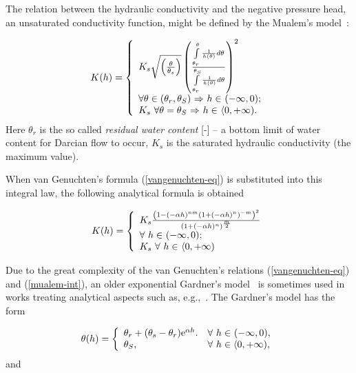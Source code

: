 \documentclass[final,3p,times,twocolumn]{elsarticle}
\begin{document}
The relation between the hydraulic conductivity and the negative pressure head, an 
unsaturated conductivity function, might be defined by the Mualem's model~\cite{mualem}:

  \begin{equation}
  \label{mualem-int}
  K(h) = \left\{
    \begin{array}{l l}
     K_s \sqrt{ \left( \frac{\theta}{\theta_s} \right)} \left( \frac{\int\limits_{\theta_r}^{\theta} \frac{1}{h(\theta)}d \theta }{\int\limits_{\theta_r}^{\theta_S} \frac{1}{h(\theta)} d \theta} \right)^2  \\
    \mbox{$\forall \theta \in (\theta_r, \theta_S )$ $\Rightarrow$ $h \in$ $(-\infty,0)$}; \\
    K_s \ \mbox{$\forall \theta= \theta_S $  $\Rightarrow$  $h \in$ $\langle 0, +\infty)$}.\\
    \end{array} \right.
    \end{equation}
Here $\theta_r$ is the so called {\em residual water content} [-] -- a bottom 
limit of water content for Darcian flow to occur, $K_s$ is the saturated 
hydraulic conductivity (the maximum value).


When van Genuchten's formula (\ref{vangenuchten-eq}) is substituted into this integral 
law, the following analytical formula is obtained

  \begin{equation}
  \label{mualem-anal}
  K(h) = \left\{
    \begin{array}{l l}
    K_s \frac{\left( 1- (-\alpha h)^{nm} \left( 1+ (-\alpha h)^n \right)^{-m} \right)^2}{\left(1+(-\alpha h)^n \right)^{\frac{m}{2}}} \\
    \mbox{$\forall$ $h \in$ $(-\infty,0)$};\\
    K_s  \ \mbox{$\forall$ $h \in$ $\langle 0, +\infty)$}\\
    \end{array} \right.
    \end{equation}

Due to the great complexity of the van Genuchten's relations (\ref{vangenuchten-eq}) 
and (\ref{mualem-int}), an older exponential Gardner's model~\cite{gardner} 
is sometimes used in works treating analytical aspects such as, e.g.,~\cite{tracy1,tracy2}. 
The Gardner's model has the form

\begin{equation}
\label{gardner-theta}
\theta (h) = \left\{ 
\begin{array}{l l}
 \theta_r + (\theta_s -\theta_r)\textrm{e}^{\alpha h}. & \mbox{$\forall$  $h \in$ $(-\infty,0)$},\\
  \theta_S, & \mbox{$\forall$ $h \in \langle 0, + \infty )$},
\end{array} \right.
\end{equation}
and 
\end{document}
